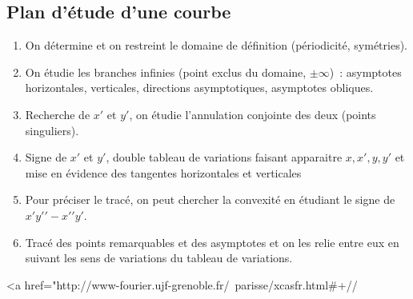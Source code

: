 \documentclass[a4paper,11pt]{book}
\begin{document}
\begin{giacjshere}
\section{Plan d'\'etude d'une courbe}
\begin{enumerate}
\item On d\'etermine et on restreint le domaine de d\'efinition
(p\'eriodicit\'e, sym\'etries). 
\item On \'etudie les branches infinies (point exclus du domaine,
$\pm \infty$)~: asymptotes horizontales, verticales, directions
asymptotiques, asymptotes obliques.
\item Recherche de $x'$ et $y'$, on \'etudie l'annulation conjointe
  des deux (points singuliers).
\item Signe de $x'$ et $y'$, double tableau de variations faisant
apparaitre $x,x',y,y'$ et mise
en \'evidence des tangentes horizontales et verticales
\item Pour pr\'eciser le trac\'e, on peut chercher la convexit\'e
en \'etudiant le signe de $x'y'{'}-x'{'}y'$.
\item Trac\'e des points remarquables et des asymptotes et
on les relie entre eux en suivant les sens de variations
du tableau de variations.
\end{enumerate}
\ifhevea
\begin{rawhtml}
<a href="http://www-fourier.ujf-grenoble.fr/~parisse/xcasfr.html#+//%
\end{rawhtml}
\fi


\end{giacjshere}
\end{document}
